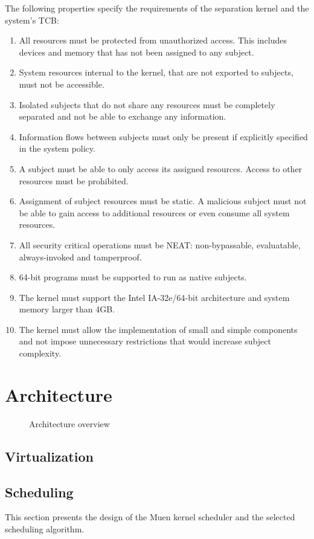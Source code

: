 The following properties specify the requirements of the separation kernel and
the system's TCB:
\begin{enumerate}
	\item All resources must be protected from unauthorized access. This
		includes devices and memory that has not been assigned to any subject.
	\item System resources internal to the kernel, that are not exported to
		subjects, must not be accessible.
	\item Isolated subjects that do not share any resources must be completely
		separated and not be able to exchange any information.
	\item Information flows between subjects must only be present if explicitly
		specified in the system policy.
	\item A subject must be able to only access its assigned resources. Access
		to other resources must be prohibited.
	\item Assignment of subject resources must be static. A malicious subject
		must not be able to gain access to additional resources or even consume
		all system resources.
	\item All security critical operations must be NEAT: non-bypassable,
		evaluatable, always-invoked and tamperproof.
	\item 64-bit programs must be supported to run as native subjects.
	\item The kernel must support the Intel IA-32e/64-bit architecture and
		system memory larger than 4GB.
	\item The kernel must allow the implementation of small and simple
		components and not impose unnecessary restrictions that would increase
		subject complexity.
\end{enumerate}

\section{Architecture}
\begin{figure}[h]
	\centering
	
	\caption{Architecture overview}
	\label{fig:architecture-overview}
\end{figure}

\subsection{Virtualization}
\subsection{Scheduling}\label{subsec:scheduling}
This section presents the design of the Muen kernel scheduler and the selected
scheduling algorithm.

